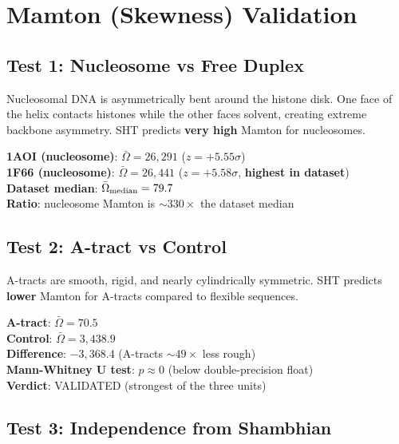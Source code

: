 \section{Mamton (Skewness) Validation}

\subsection{Test 1: Nucleosome vs Free Duplex}

Nucleosomal DNA is asymmetrically bent around the histone disk. One face of the helix contacts histones while the other faces solvent, creating extreme backbone asymmetry. SHT predicts \textbf{very high} Mamton for nucleosomes.

\begin{keyresult}
    \textbf{1AOI (nucleosome)}: $\bar{\Omega} = 26{,}291$ ($z = +5.55\sigma$) \\
    \textbf{1F66 (nucleosome)}: $\bar{\Omega} = 26{,}441$ ($z = +5.58\sigma$, \textbf{highest in dataset}) \\
    \textbf{Dataset median}: $\bar{\Omega}_{\rm median} = 79.7$ \\
    \textbf{Ratio}: nucleosome Mamton is $\sim\!330\times$ the dataset median
\end{keyresult}

\subsection{Test 2: A-tract vs Control}

A-tracts are smooth, rigid, and nearly cylindrically symmetric. SHT predicts \textbf{lower} Mamton for A-tracts compared to flexible sequences.

\begin{keyresult}
    \textbf{A-tract}: $\bar{\Omega} = 70.5$ \\
    \textbf{Control}: $\bar{\Omega} = 3{,}438.9$ \\
    \textbf{Difference}: $-3{,}368.4$ (A-tracts $\sim\!49\times$ less rough) \\
    \textbf{Mann-Whitney U test}: $p \approx 0$ (below double-precision float) \\
    \textbf{Verdict}: VALIDATED (strongest of the three units)
\end{keyresult}

\subsection{Test 3: Independence from Shambhian}

